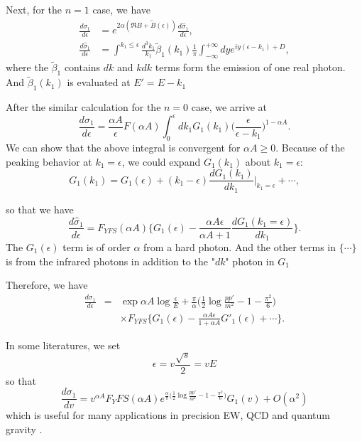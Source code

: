 Next, for the $n = 1$ case, we have
\begin{align}
\frac{d\sigma_1}{d\epsilon} &= e^{2\alpha(\Re B + \tilde{B}(\epsilon))} \frac{d\hat{\sigma}_1}{d\epsilon},\nonumber\\
\frac{d\hat{\sigma}_1}{d\epsilon} &= \int^{k_1 \le \epsilon} \frac{d^3 k_1}{k_1}\tilde{\beta}_1(k_1)\frac{1}{\pi}\int_{-\infty}^{+\infty}dy e^{iy(\epsilon - k_1)+D},
\end{align}
where the $\tilde{\beta}_1$ contains $dk$ and $kdk$ terms form the emission of one real photon. And $\tilde{\beta}_1(k_1)$ is evaluated at $E' = E - k_1$

After the similar calculation for the $n = 0$ case, we arrive at 
\begin{equation}
\frac{d\sigma_1}{d\epsilon} = \frac{\alpha A}{\epsilon} F(\alpha A) \int_{0}^{\epsilon} dk_1 G_1(k_1)\Big(\frac{\epsilon}{\epsilon - k_1}\Big)^{1 - \alpha A}.
\end{equation}
We can show that the above integral is convergent for $\alpha A \ge 0$. Because of the peaking behavior at $k_1 = \epsilon$, we could expand $G_1(k_1)$ about $k_1 = \epsilon$:
\begin{equation}
G_1(k_1) = G_1(\epsilon) + (k_1 - \epsilon)\frac{dG_1(k_1)}{dk_1}\biggr|_{k_1 = \epsilon} + \cdots,
\end{equation}

so that we have 
\begin{equation}
\frac{d\hat{\sigma}_1}{d\epsilon} = F_{YFS}(\alpha A) \Biggl\{G_1(\epsilon) - \frac{\alpha A \epsilon}{\alpha A +1}\frac{dG_1(k_1=\epsilon)}{dk_1}\Biggr\}.
\end{equation}
The $G_1(\epsilon)$ term is of order $\alpha$ from a hard photon. And the other terms in $\{\cdots\}$ is from the infrared photons in addition to the "$dk$" photon in $G_1$

Therefore, we have \cite{BFLWQFT}
\begin{eqnarray}
\frac{d\sigma_1}{d\epsilon} &=& \exp \alpha A \log\frac{\epsilon}{E} + \frac{\pi}{\alpha}\Big(\frac{1}{2}\log\frac{pp'}{m^2} - 1 - \frac{\pi^2}{6}\Big)\nonumber\\
&& \times F_{YFS}\Biggl\{ G_1(\epsilon) -\frac{\alpha A \epsilon}{1 + \alpha A}G'_1(\epsilon)+\cdots\Biggr\}.
\end{eqnarray}

In some literatures, we set 
\begin{equation}
\epsilon = v \frac{\sqrt{s}}{2} = vE
\end{equation}
so that
\begin{equation}
\frac{d\sigma_1}{dv} = v^{\alpha A} F_YFS(\alpha A) e^{\frac{\alpha}{\pi}\big(\frac{1}{2}\log\frac{pp'}{m^2}-1-\frac{\pi^2}{6}\big)} G_1(v) + O(\alpha^2)
\end{equation}
which is useful for many applications in precision EW, QCD and quantum gravity \cite{BFLWEWQCDQG}.